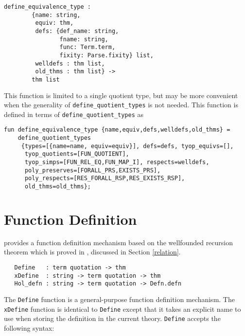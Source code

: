 \begin{verbatim}
define_equivalence_type :
        {name: string,
         equiv: thm,
         defs: {def_name: string,
                fname: string,
                func: Term.term,
                fixity: Parse.fixity} list,
         welldefs : thm list,
         old_thms : thm list} ->
        thm list
\end{verbatim}

\noindent
This function is limited to a single quotient type, but may be
more convenient when the generality of {\tt define\_quotient\_types}
is not needed.
This function is defined in terms of {\tt define\_quotient\_types} as

\begin{verbatim}
fun define_equivalence_type {name,equiv,defs,welldefs,old_thms} =
    define_quotient_types
     {types=[{name=name, equiv=equiv}], defs=defs, tyop_equivs=[],
      tyop_quotients=[FUN_QUOTIENT],
      tyop_simps=[FUN_REL_EQ,FUN_MAP_I], respects=welldefs,
      poly_preserves=[FORALL_PRS,EXISTS_PRS],
      poly_respects=[RES_FORALL_RSP,RES_EXISTS_RSP],
      old_thms=old_thms};
\end{verbatim}


\section{Function Definition}\label{TFL}

\HOL{} provides a function definition mechanism based on the
wellfounded recursion theorem which is proved in ,
discussed in Section \ref{relation}.

\begin{verbatim}
   Define   : term quotation -> thm
   xDefine  : string -> term quotation -> thm
   Hol_defn : string -> term quotation -> Defn.defn
\end{verbatim}

The \texttt{Define} function is a general-purpose function definition
mechanism. The \texttt{xDefine} function is identical to
{\small\verb+Define+} except that it takes an explicit name to use when
storing the definition in the current theory. {\small\tt Define}
accepts the following syntax:

